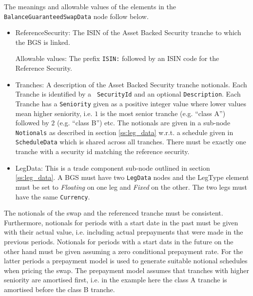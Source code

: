The meanings and allowable values of the elements in the \lstinline!BalanceGuaranteedSwapData!  node follow below.

\begin{itemize}

\item ReferenceSecurity: The ISIN of the Asset Backed Security tranche to which the BGS is linked.

Allowable values:  The prefix {\tt ISIN:} followed by an ISIN code for the Reference Security.

\item Tranches: A description of the Asset Backed Security tranche notionals. Each Tranche is identified by a {\tt
    SecurityId} and an optional {\tt Description}. Each Tranche has a {\tt Seniority} given as a positive integer value
  where lower values mean higher seniority, i.e. $1$ is the most senior tranche (e.g. ``class A'') followed by $2$
  (e.g. ``class B'') etc.  The notionals are given in a sub-node {\tt Notionals} as described in section
  \ref{ss:leg_data} w.r.t. a schedule given in {\tt ScheduleData} which is shared across all tranches. There must be
  exactly one tranche with a security id matching the reference security.

\item LegData: This is a trade component sub-node outlined in section \ref{ss:leg_data}. A BGS must have two  \lstinline!LegData! nodes and the LegType element must be set to \emph{Floating} on one leg and \emph{Fixed} on the other. The two legs must have the same \lstinline!Currency!.

\end{itemize}

The notionals of the swap and the referenced tranche must be consistent. Furthermore, notionals for periods with a start
date in the past must be given with their actual value, i.e. including actual prepayments that were made in the previous
periods. Notionals for periods with a start dats in the future on the other hand must be given assuming a zero
conditional prepayment rate. For the latter periods a prepayment model is used to generate suitable notional schedules
when pricing the swap. The prepayment model assumes that tranches with higher seniority are amortised first, i.e. in the
example here the class A tranche is amortised before the class B tranche.

